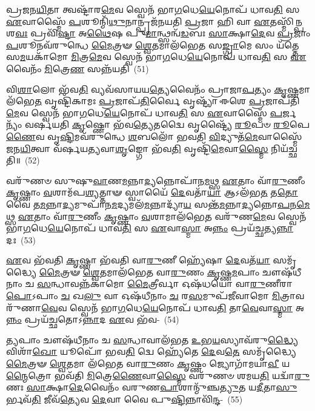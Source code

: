 𑌪𑍍𑌰𑌜𑌨\-\ul{𑌯𑌿}\-𑌤𑌾 𑌤𑍍𑌵𑌷𑍍𑌟𑌾᳴𑌰\-\ul{𑌮𑍇}\-𑌵 𑌸𑍍𑌵𑍇𑌨᳴ 𑌭𑌾\-\ul{𑌗}\-𑌧𑍇\-\ul{𑌯𑍇}\-𑌨𑍋𑌪᳴ 𑌧𑌾𑌵\-\ul{𑌤𑌿} 𑌸 \ul{𑌏}\-𑌵𑌾𑌸𑍍𑌮𑍈᳴ \ul{𑌪}\-𑌶𑍂𑌨𑍍𑌮𑌿᳴\-\ul{𑌥𑍁}\-𑌨𑌾𑌨𑍍𑌪𑍍𑌰𑌜᳴𑌨𑌯𑌤𑌿 \ul{𑌪𑍍𑌰}\-𑌜𑌾 𑌹𑌿 𑌵𑌾 \ul{𑌏}\-𑌤𑌸𑍍𑌮𑌿᳴\-\ul{𑌨𑍍𑌪}\-𑌶\-\ul{𑌵𑌃} 𑌪𑍍𑌰𑌵𑌿᳴\-\ul{𑌷𑍍𑌟𑌾} 𑌅\-\ul{𑌥𑍈}\-𑌷 𑌪𑍁\-\ul{𑌮𑌾}\-𑌨𑍍𑌥𑍍𑌸𑌨𑍍𑌵᳴\-\ul{𑌡}\-𑌬𑌃 \ul{𑌸𑌾}\-𑌕𑍍𑌷𑌾\-\ul{𑌦𑍇}\-𑌵 \ul{𑌪𑍍𑌰}\-𑌜𑌾𑌂 \ul{𑌪}\-𑌶𑍂𑌨𑌵᳴\-𑌰𑍁𑌨𑍍𑌧𑍇 \ul{𑌮𑍈}\-𑌤𑍍𑌰𑍟 \ul{𑌶𑍍𑌵𑍇}\-𑌤𑌮𑌾𑌲᳴𑌭𑍇𑌤 𑌸\-\ul{𑌙𑍍𑌗𑍍𑌰𑌾}\-𑌮𑍇 𑌸𑌂 𑌯᳴𑌤𑍍𑌤𑍇 𑌸\-\ul{𑌮}\-𑌯𑌕𑌾᳴𑌮𑍋 \ul{𑌮𑌿}\-𑌤𑍍𑌰\-\ul{𑌮𑍇}\-𑌵 𑌸𑍍𑌵𑍇𑌨᳴ 𑌭𑌾\-\ul{𑌗}\-𑌧𑍇\-\ul{𑌯𑍇}\-𑌨𑍋𑌪᳴ 𑌧𑌾𑌵\-\ul{𑌤𑌿} 𑌸 \ul{𑌏}\-𑌵𑍈𑌨𑌂᳴ \ul{𑌮𑌿}\-𑌤𑍍𑌰𑍇\-\ul{𑌣} 𑌸𑌨𑍍𑌨᳴𑌯𑌤𑌿~(51)

𑌵𑌿\-\ul{𑌶𑌾}\-𑌲𑍋 𑌭᳴𑌵\-\ul{𑌤𑌿} 𑌵𑍍𑌯𑌵᳴𑌸𑌾𑌯𑌯\-\ul{𑌤𑍍𑌯𑍇}\-𑌵𑍈𑌨𑌂᳴ 𑌪𑍍𑌰𑌾𑌜𑌾\-\ul{𑌪}\-𑌤𑍍𑌯𑌂 \ul{𑌕𑍃}\-𑌷𑍍𑌣𑌮𑌾\-𑌲᳴𑌭𑍇\-\ul{𑌤} 𑌵𑍃𑌷𑍍𑌟𑌿᳴𑌕𑌾𑌮𑌃 \ul{𑌪𑍍𑌰}\-𑌜𑌾𑌪᳴\-\ul{𑌤𑌿}\-𑌰𑍍𑌵𑍈 𑌵𑍃𑌷𑍍𑌟𑍍𑌯𑌾᳴ 𑌈𑌶𑍇 \ul{𑌪𑍍𑌰}\-𑌜𑌾𑌪᳴𑌤𑌿\-\ul{𑌮𑍇}\-𑌵 𑌸𑍍𑌵𑍇𑌨᳴ 𑌭𑌾\-\ul{𑌗}\-𑌧𑍇\-\ul{𑌯𑍇}\-𑌨𑍋𑌪᳴ 𑌧𑌾𑌵\-\ul{𑌤𑌿} 𑌸 \ul{𑌏}\-𑌵𑌾𑌸𑍍𑌮𑍈᳴ \ul{𑌪}\-𑌰𑍍𑌜𑌨𑍍𑌯𑌂᳴ 𑌵𑌰𑍍\mbox{}𑌷𑌯𑌤𑌿 \ul{𑌕𑍃}\-𑌷𑍍𑌣𑍋 𑌭᳴𑌵\-\ul{𑌤𑍍𑌯𑍇}\-𑌤𑌦𑍍𑌵𑍈 𑌵𑍃𑌷𑍍𑌟𑍍𑌯𑍈᳴ \ul{𑌰𑍂}\-𑌪𑍞 \ul{𑌰𑍂}\-𑌪𑍇\-\ul{𑌣𑍈}\-𑌵 𑌵𑍃\-\ul{𑌷𑍍𑌟𑌿}\-𑌮𑌵᳴\-𑌰𑍁𑌨𑍍𑌧𑍇 \ul{𑌶}\-𑌬𑌲𑍋᳴ 𑌭𑌵𑌤𑌿 \ul{𑌵𑌿}\-𑌦𑍍𑌯𑍁𑌤᳴\-\ul{𑌮𑍇}\-𑌵𑌾𑌸𑍍𑌮𑍈᳴ 𑌜𑌨\-\ul{𑌯𑌿}\-𑌤𑍍𑌵𑌾 𑌵᳴𑌰𑍍\mbox{}𑌷𑌯𑌤𑍍𑌯𑌵𑌾\-\ul{𑌶𑍃}\-𑌙𑍍𑌗𑍋 𑌭᳴𑌵\-\ul{𑌤𑌿} 𑌵𑍃𑌷𑍍𑌟𑌿᳴\-\ul{𑌮𑍇}\-𑌵𑌾\-\ul{𑌸𑍍𑌮𑍈} 𑌨𑌿𑌯᳴𑌚𑍍𑌛𑌤𑌿॥~(52)

{\anuvakamend[\-\ul{𑌶𑍃}\-𑌣𑌾𑌤𑌿᳴ 𑌮𑌿\-\ul{𑌥𑍁}\-𑌨𑌾𑌨𑌾॑𑌨𑍍𑌨𑌯𑌤𑌿 𑌯𑌚𑍍𑌛𑌤𑌿॥]}

𑌵𑌰𑍁᳴𑌣𑍞 𑌸𑍁𑌷𑍁\-\ul{𑌵𑌾}\-𑌣\-\ul{𑌮}\-𑌨𑍍𑌨𑌾\-\ul{𑌦𑍍𑌯}\-𑌨𑍍𑌨𑍋𑌪𑌾᳴𑌨\-\ul{𑌮}\-𑌥𑍍𑌸 \ul{𑌏}\-𑌤𑌾𑌂 𑌵𑌾᳴\-\ul{𑌰𑍁}\-𑌣𑍀𑌂 \ul{𑌕𑍃}\-𑌷𑍍𑌣𑌾𑌂 \ul{𑌵}\-𑌶𑌾𑌮᳴𑌪\-\ul{𑌶𑍍𑌯}\-𑌤𑍍𑌤𑌾𑍟 𑌸𑍍𑌵𑌾𑌯𑍈᳴ \ul{𑌦𑍇}\-𑌵𑌤𑌾᳴\-\ul{𑌯𑌾} 𑌆\-𑌽𑌲᳴𑌭\-\ul{𑌤} 𑌤\-\ul{𑌤𑍋} 𑌵𑍈 𑌤\-\ul{𑌮}\-𑌨𑍍𑌨𑌾\-\ul{𑌦𑍍𑌯}\-𑌮𑍁𑌪𑌾᳴𑌨\-\ul{𑌮}\-𑌦𑍍𑌯𑌮𑌲᳴\-\ul{𑌮}\-𑌨𑍍𑌨𑌾𑌦𑍍𑌯𑌾᳴\-\ul{𑌯} 𑌸𑌨𑍍𑌤᳴\-\ul{𑌮}\-𑌨𑍍𑌨𑌾\-\ul{𑌦𑍍𑌯}\-𑌨𑍍𑌨𑍋\-\ul{𑌪}\-𑌨\-\ul{𑌮𑍇}\-𑌥𑍍𑌸 \ul{𑌏}\-𑌤𑌾𑌂 𑌵𑌾᳴\-\ul{𑌰𑍁}\-𑌣𑍀𑌂 \ul{𑌕𑍃}\-𑌷𑍍𑌣𑌾𑌂 \ul{𑌵}\-𑌶𑌾𑌮𑌾\-𑌲᳴𑌭𑍇\-\ul{𑌤} 𑌵𑌰𑍁᳴𑌣\-\ul{𑌮𑍇}\-𑌵 𑌸𑍍𑌵𑍇𑌨᳴ 𑌭𑌾\-\ul{𑌗}\-𑌧𑍇\-\ul{𑌯𑍇}\-𑌨𑍋𑌪᳴ 𑌧𑌾𑌵\-\ul{𑌤𑌿} 𑌸 \ul{𑌏}\-𑌵𑌾\-\ul{𑌸𑍍𑌮𑌾} 𑌅\-\ul{𑌨𑍍𑌨𑌂} 𑌪𑍍𑌰𑌯᳴𑌚𑍍𑌛𑌤𑍍𑌯\-\ul{𑌨𑍍𑌨𑌾}\-𑌦𑌃~(53)

\-\ul{𑌏}\-𑌵 𑌭᳴𑌵𑌤𑌿 \ul{𑌕𑍃}\-𑌷𑍍𑌣𑌾 𑌭᳴𑌵𑌤𑌿 𑌵𑌾\-\ul{𑌰𑍁}\-𑌣𑍀 𑌹𑍍𑌯𑍇᳴𑌷𑌾 \ul{𑌦𑍇}\-𑌵𑌤᳴\-\ul{𑌯𑌾} 𑌸𑌮𑍃᳴𑌦𑍍𑌧𑍍𑌯𑍈 \ul{𑌮𑍈}\-𑌤𑍍𑌰𑍟 \ul{𑌶𑍍𑌵𑍇}\-𑌤𑌮𑌾𑌲᳴𑌭𑍇𑌤 𑌵𑌾\-\ul{𑌰𑍁}\-𑌣𑌂 \ul{𑌕𑍃}\-𑌷𑍍𑌣\-\ul{𑌮}\-𑌪𑌾𑌂 𑌚𑍗𑌷᳴𑌧𑍀𑌨𑌾𑌂 𑌚 \ul{𑌸}\-𑌨𑍍𑌧𑌾𑌵𑌨𑍍𑌨᳴𑌕𑌾𑌮𑍋 \ul{𑌮𑍈}\-𑌤𑍍𑌰𑍀𑌰𑍍𑌵𑌾 𑌓𑌷᳴𑌧𑌯𑍋 𑌵𑌾\-\ul{𑌰𑍁}\-𑌣𑍀𑌰𑌾\-\ul{𑌪𑍋}\-\-𑌽𑌪𑌾𑌂 \ul{𑌚} 𑌖\-\ul{𑌲𑍁} 𑌵𑌾 𑌓𑌷᳴𑌧𑍀𑌨𑌾𑌂 \ul{𑌚} 𑌰\-\ul{𑌸}\-𑌮𑍁𑌪᳴𑌜𑍀𑌵𑌾𑌮𑍋 \ul{𑌮𑌿}\-𑌤𑍍𑌰𑌾𑌵𑌰𑍁᳴𑌣𑌾\-\ul{𑌵𑍇}\-𑌵 𑌸𑍍𑌵𑍇𑌨᳴ 𑌭𑌾\-\ul{𑌗}\-𑌧𑍇\-\ul{𑌯𑍇}\-𑌨𑍋𑌪᳴ 𑌧𑌾𑌵\-\ul{𑌤𑌿} 𑌤𑌾\-\ul{𑌵𑍇}\-𑌵𑌾\-\ul{𑌸𑍍𑌮𑌾} 𑌅\-\ul{𑌨𑍍𑌨𑌂} 𑌪𑍍𑌰𑌯᳴𑌚𑍍𑌛𑌤𑍋\-𑌽\-\ul{𑌨𑍍𑌨𑌾}\-𑌦 \ul{𑌏}\-𑌵 𑌭᳴𑌵-~(54)

\-\ul{𑌤𑍍𑌯}\-𑌪𑌾𑌂 𑌚𑍗𑌷᳴𑌧𑍀𑌨𑌾𑌂 𑌚 \ul{𑌸}\-𑌨𑍍𑌧𑌾𑌵𑌾𑌲᳴𑌭𑌤 \ul{𑌉}\-𑌭\-\ul{𑌯}\-𑌸𑍍𑌯𑌾𑌵᳴𑌰𑍁\-\ul{𑌦𑍍𑌧𑍍𑌯𑍈} 𑌵𑌿𑌶𑌾᳴\-\ul{𑌖𑍋} 𑌯𑍂𑌪𑍋᳴ 𑌭𑌵\-\ul{𑌤𑌿} 𑌦𑍍𑌵𑍇 𑌹𑍍𑌯𑍇᳴𑌤𑍇 \ul{𑌦𑍇}\-𑌵\-\ul{𑌤𑍇} 𑌸𑌮𑍃᳴𑌦𑍍𑌧𑍍𑌯𑍈 \ul{𑌮𑍈}\-𑌤𑍍𑌰𑍟 \ul{𑌶𑍍𑌵𑍇}\-𑌤𑌮𑌾 𑌲᳴𑌭𑍇𑌤 𑌵𑌾\-\ul{𑌰𑍁}\-𑌣𑌂 \ul{𑌕𑍃}\-𑌷𑍍𑌣𑌂 𑌜𑍍𑌯𑍋𑌗𑌾᳴𑌮𑌯𑌾\-\ul{𑌵𑍀} 𑌯\-\ul{𑌨𑍍𑌮𑍈}\-𑌤𑍍𑌰𑍋 𑌭𑌵᳴𑌤𑌿 \ul{𑌮𑌿}\-𑌤𑍍𑌰𑍇\-\ul{𑌣𑍈}\-𑌵𑌾\-\ul{𑌸𑍍𑌮𑍈} 𑌵𑌰𑍁᳴𑌣𑍞 𑌶𑌮𑌯\-\ul{𑌤𑌿} 𑌯𑌦𑍍𑌵𑌾᳴\-\ul{𑌰𑍁}\-𑌣𑌃 \ul{𑌸𑌾}\-𑌕𑍍𑌷𑌾\-\ul{𑌦𑍇}\-𑌵𑍈𑌨𑌂᳴ 𑌵𑌰𑍁𑌣\-\-\ul{𑌪𑌾}\-𑌶𑌾𑌨𑍍𑌮𑍁᳴𑌞𑍍𑌚\-\ul{𑌤𑍍𑌯𑍁}\-𑌤 𑌯\-\ul{𑌦𑍀}\-𑌤𑌾\-\ul{𑌸𑍁}\-𑌰𑍍𑌭𑌵᳴\-\ul{𑌤𑌿} 𑌜𑍀𑌵᳴\-\ul{𑌤𑍍𑌯𑍇}\-𑌵 \ul{𑌦𑍇}\-𑌵𑌾 𑌵𑍈 𑌪𑍁\-\ul{𑌷𑍍𑌟𑌿}\-𑌨𑍍𑌨𑌾𑌵𑌿᳴\-\ul{𑌨𑍍𑌦}\--~(55)

